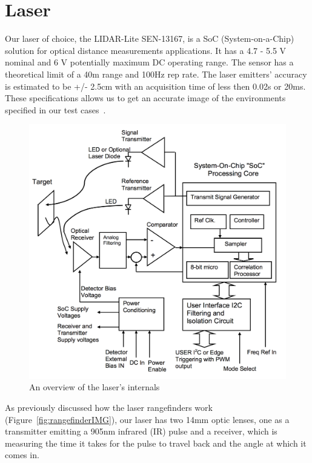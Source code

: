 \clearpage
\section{Laser} %

Our laser of choice, the LIDAR-Lite SEN-13167, is a SoC (System-on-a-Chip) solution for optical distance measurements applications. It has a 4.7 - 5.5 V nominal and 6 V potentially maximum DC operating range. The sensor has a theoretical limit of a 40m range and 100Hz rep rate. The laser emitters' accuracy is estimated to be +/- 2.5cm with an acquisition time of less then 0.02s or 20ms. These specifications allows us to get an accurate image of the environments specified in our test cases~\cite{lidarsum}.

\begin{figure}[H]
	\centering
	\includegraphics[scale=.4]{images/internallidar.png}
	\caption{An overview of the laser's internals}
	\label{fig:internallidar}
\end{figure}

As previously discussed how the laser rangefinders work (Figure~\ref{fig:rangefinderIMG}), our laser has two 14mm optic lenses, one as a transmitter emitting a 905nm infrared (IR) pulse and a receiver, which is measuring the time it takes for the pulse to travel back and the angle at which it comes in.

